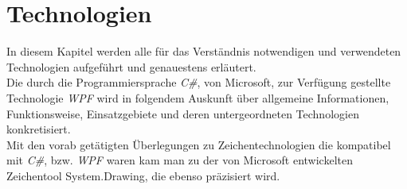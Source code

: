 
\chapter{Technologien}
In diesem Kapitel werden alle für das Verständnis notwendigen und verwendeten Technologien aufgeführt und genauestens erläutert.
\\Die durch die Programmiersprache \textit{C\#}, von Microsoft, zur Verfügung gestellte Technologie \textit{WPF} wird in folgendem Auskunft über 
allgemeine Informationen, Funktionsweise, Einsatzgebiete und deren untergeordneten Technologien konkretisiert. 
\\Mit den vorab getätigten Überlegungen zu Zeichentechnologien die kompatibel mit \textit{C\#}, bzw. \textit{WPF} waren kam man zu der von Microsoft
entwickelten Zeichentool System.Drawing, die ebenso präzisiert wird.
